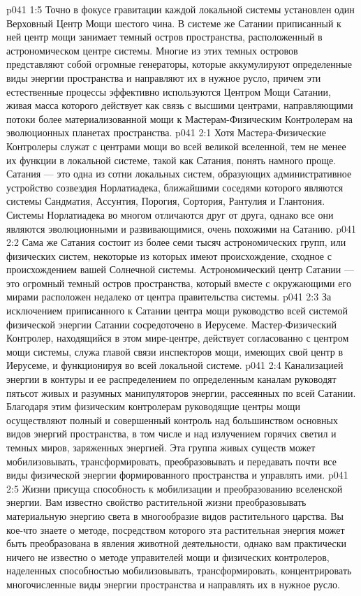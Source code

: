 \vs p041 1:5 Точно в фокусе гравитации каждой локальной системы установлен один Верховный Центр Мощи шестого чина. В системе же Сатании приписанный к ней центр мощи занимает темный остров пространства, расположенный в астрономическом центре системы. Многие из этих темных островов представляют собой огромные генераторы, которые аккумулируют определенные виды энергии пространства и направляют их в нужное русло, причем эти естественные процессы эффективно используются Центром Мощи Сатании, живая масса которого действует как связь с высшими центрами, направляющими потоки более материализованной мощи к Мастерам\hyp{}Физическим Контролерам на эволюционных планетах пространства.
\vs p041 2:1 Хотя Мастера\hyp{}Физические Контролеры служат с центрами мощи во всей великой вселенной, тем не менее их функции в локальной системе, такой как Сатания, понять намного проще. Сатания --- это одна из сотни локальных систем, образующих административное устройство созвездия Норлатиадека, ближайшими соседями которого являются системы Сандматия, Ассунтия, Порогия, Сортория, Рантулия и Глантония. Системы Норлатиадека во многом отличаются друг от друга, однако все они являются эволюционными и развивающимися, очень похожими на Сатанию.
\vs p041 2:2 Сама же Сатания состоит из более семи тысяч астрономических групп, или физических систем, некоторые из которых имеют происхождение, сходное с происхождением вашей Солнечной системы. Астрономический центр Сатании --- это огромный темный остров пространства, который вместе с окружающими его мирами расположен недалеко от центра правительства системы.
\vs p041 2:3 \pc За исключением приписанного к Сатании центра мощи руководство всей системой физической энергии Сатании сосредоточено в Иерусеме. Мастер\hyp{}Физический Контролер, находящийся в этом мире\hyp{}центре, действует согласованно с центром мощи системы, служа главой связи инспекторов мощи, имеющих свой центр в Иерусеме, и функционируя во всей локальной системе.
\vs p041 2:4 Канализацией энергии в контуры и ее распределением по определенным каналам руководят пятьсот живых и разумных манипуляторов энергии, рассеянных по всей Сатании. Благодаря этим физическим контролерам руководящие центры мощи осуществляют полный и совершенный контроль над большинством основных видов энергий пространства, в том числе и над излучением горячих светил и темных миров, заряженных энергией. Эта группа живых существ может мобилизовывать, трансформировать, преобразовывать и передавать почти все виды физической энергии формированного пространства и управлять ими.
\vs p041 2:5 Жизни присуща способность к мобилизации и преобразованию вселенской энергии. Вам известно свойство растительной жизни преобразовывать материальную энергию света в многообразие видов растительного царства. Вы кое\hyp{}что знаете о методе, посредством которого эта растительная энергия может быть преобразована в явления животной деятельности, однако вам практически ничего не известно о методе управителей мощи и физических контролеров, наделенных способностью мобилизовывать, трансформировать, концентрировать многочисленные виды энергии пространства и направлять их в нужное русло.
